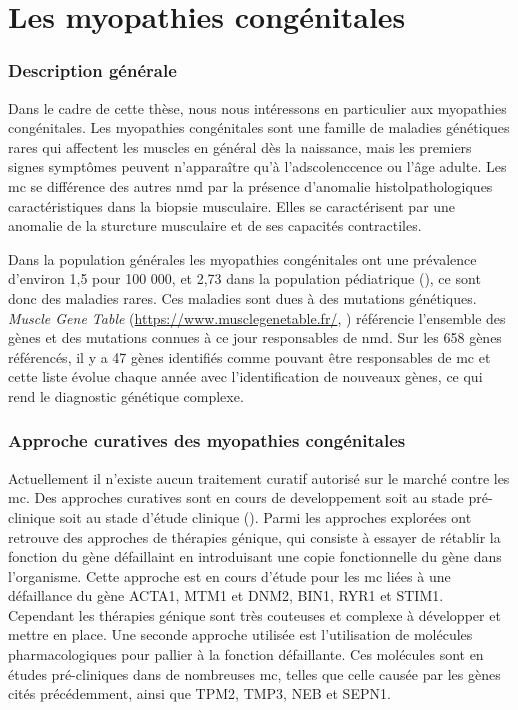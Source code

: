 \section{Les myopathies congénitales}
\subsubsection{Description générale}
Dans le cadre de cette thèse, nous nous intéressons en particulier aux myopathies congénitales. Les myopathies congénitales sont une famille de maladies génétiques rares qui affectent les muscles en général dès la naissance, mais les premiers signes symptômes peuvent n'apparaître qu'à l'adscolenccence ou l'âge adulte. Les \gls{mc} se différence des autres \gls{nmd} par la présence d'anomalie histolpathologiques caractéristiques dans la biopsie musculaire. Elles se caractérisent par une anomalie de la sturcture musculaire et de ses capacités contractiles.

Dans la population générales les myopathies congénitales ont une prévalence d'environ 1,5 pour 100 000, et 2,73 dans la population pédiatrique (\cite{huang_systematic_2021}), ce sont donc des maladies rares. Ces maladies sont dues à des mutations génétiques. \textit{Muscle Gene Table} (\href{https://www.musclegenetable.fr/}{https://www.musclegenetable.fr/}, \cite{benarroch_2023_2023}) référencie l'ensemble des gènes et des mutations connues à ce jour responsables de \gls{nmd}. Sur les 658 gènes référencés, il y a 47 gènes identifiés comme pouvant être responsables de \gls{mc} et cette liste évolue chaque année avec l'identification de nouveaux gènes, ce qui rend le diagnostic génétique complexe. 

\subsubsection{Approche curatives des myopathies congénitales}
Actuellement il n'existe aucun traitement curatif autorisé sur le marché contre les \gls{mc}. Des approches curatives sont en cours de developpement soit au stade pré-clinique soit au stade d'étude clinique (\cite{gineste_therapeutic_2023, guan_gene_2016}). Parmi les approches explorées ont retrouve des approches de thérapies génique, qui consiste à essayer de rétablir la fonction du gène défaillaint en introduisant une copie fonctionnelle du gène dans l'organisme. Cette approche est en cours d'étude pour les \gls{mc} liées à une défaillance du gène ACTA1, MTM1 et DNM2, BIN1, RYR1 et STIM1. Cependant les thérapies génique sont très couteuses et complexe à développer et mettre en place. Une seconde approche utilisée est l'utilisation de molécules pharmacologiques pour pallier à la fonction défaillante. Ces molécules sont en études pré-cliniques dans de nombreuses \gls{mc}, telles que celle causée par les gènes cités précédemment, ainsi que TPM2, TMP3, NEB et SEPN1. 

